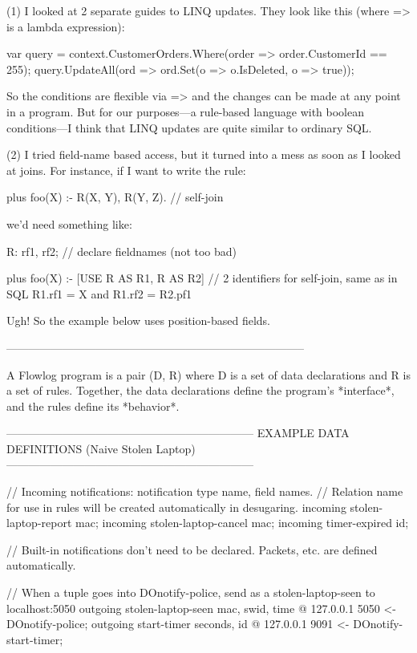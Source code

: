 (1) I looked at 2 separate guides to LINQ updates. They look like this
(where => is a lambda expression):

var query = context.CustomerOrders.Where(order => order.CustomerId == 255);
query.UpdateAll(ord => ord.Set(o => o.IsDeleted, o => true));

So the conditions are flexible via => and the changes can be made at
any point in a program. But for our purposes---a rule-based language
with boolean conditions---I think that LINQ updates are quite similar
to ordinary SQL.

(2) I tried field-name based access, but it turned into a mess as soon
as I looked at joins. For instance, if I want to write the rule:

plus foo(X) :- R(X, Y), R(Y, Z). // self-join

we'd need something like:

R: rf1, rf2;  // declare fieldnames (not too bad)

plus foo(X) :- 
  [USE R AS R1, R AS R2] // 2 identifiers for self-join, same as in SQL
  R1.rf1 = X and
  R1.rf2 = R2.pf1
  
Ugh! So the example below uses position-based fields.

--------------------------------------------------------------------------------

A Flowlog program is a pair (D, R) where D is a set of data
declarations and R is a set of rules. Together, the data declarations
define the program's *interface*, and the rules define its *behavior*.

------------------------------------------------------------------
EXAMPLE DATA DEFINITIONS (Naive Stolen Laptop)
------------------------------------------------------------------

  // Incoming notifications: notification type name, field names.
  // Relation name for use in rules will be created automatically in desugaring.
  incoming stolen-laptop-report {mac};
  incoming stolen-laptop-cancel {mac};
  incoming timer-expired {id};  

  // Built-in notifications don't need to be declared. Packets, etc. are defined automatically.
  
  // When a tuple goes into DOnotify-police, send as a stolen-laptop-seen to localhost:5050
  outgoing stolen-laptop-seen {mac, swid, time} @ 127.0.0.1 5050 
    <- DOnotify-police;
  outgoing start-timer {seconds, id} @ 127.0.0.1 9091 
    <- DOnotify-start-timer;

